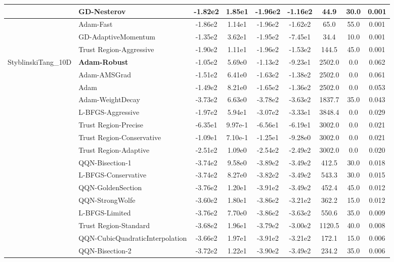 \documentclass{article}
\begin{document}
\begin{longtable}{|l|l|c|c|c|c|c|c|c|}
\hline
 & GD-Nesterov & -1.82e2 & 1.85e1 & -1.96e2 & -1.16e2 & 44.9 & 30.0 & 0.001 \\
\hline
 & Adam-Fast & -1.86e2 & 1.14e1 & -1.96e2 & -1.62e2 & 65.0 & 55.0 & 0.001 \\
\hline
 & GD-AdaptiveMomentum & -1.35e2 & 3.62e1 & -1.95e2 & -7.45e1 & 34.4 & 10.0 & 0.001 \\
\hline
 & Trust Region-Aggressive & -1.90e2 & 1.11e1 & -1.96e2 & -1.53e2 & 144.5 & 45.0 & 0.001 \\
StyblinskiTang\_10D & \textbf{Adam-Robust} & -1.05e2 & 5.69e0 & -1.13e2 & -9.23e1 & 2502.0 & 0.0 & 0.062 \\
\hline
 & Adam-AMSGrad & -1.51e2 & 6.41e0 & -1.63e2 & -1.38e2 & 2502.0 & 0.0 & 0.061 \\
\hline
 & Adam & -1.49e2 & 8.21e0 & -1.65e2 & -1.36e2 & 2502.0 & 0.0 & 0.053 \\
\hline
 & Adam-WeightDecay & -3.73e2 & 6.63e0 & -3.78e2 & -3.63e2 & 1837.7 & 35.0 & 0.043 \\
\hline
 & L-BFGS-Aggressive & -1.97e2 & 5.94e1 & -3.07e2 & -3.33e1 & 3848.4 & 0.0 & 0.029 \\
\hline
 & Trust Region-Precise & -6.35e1 & 9.97e-1 & -6.56e1 & -6.19e1 & 3002.0 & 0.0 & 0.021 \\
\hline
 & Trust Region-Conservative & -1.09e1 & 7.10e-1 & -1.25e1 & -9.28e0 & 3002.0 & 0.0 & 0.021 \\
\hline
 & Trust Region-Adaptive & -2.51e2 & 1.09e0 & -2.54e2 & -2.49e2 & 3002.0 & 0.0 & 0.020 \\
\hline
 & QQN-Bisection-1 & -3.74e2 & 9.58e0 & -3.89e2 & -3.49e2 & 412.5 & 30.0 & 0.018 \\
\hline
 & L-BFGS-Conservative & -3.74e2 & 8.27e0 & -3.82e2 & -3.49e2 & 543.3 & 30.0 & 0.015 \\
\hline
 & QQN-GoldenSection & -3.76e2 & 1.20e1 & -3.91e2 & -3.49e2 & 452.4 & 45.0 & 0.012 \\
\hline
 & QQN-StrongWolfe & -3.60e2 & 1.80e1 & -3.86e2 & -3.21e2 & 362.2 & 15.0 & 0.012 \\
\hline
 & L-BFGS-Limited & -3.76e2 & 7.70e0 & -3.86e2 & -3.63e2 & 550.6 & 35.0 & 0.009 \\
\hline
 & Trust Region-Standard & -3.68e2 & 1.96e1 & -3.79e2 & -3.00e2 & 1120.5 & 40.0 & 0.008 \\
\hline
 & QQN-CubicQuadraticInterpolation & -3.66e2 & 1.97e1 & -3.91e2 & -3.21e2 & 172.1 & 15.0 & 0.006 \\
\hline
 & QQN-Bisection-2 & -3.72e2 & 1.22e1 & -3.90e2 & -3.49e2 & 234.2 & 35.0 & 0.006 \\

\end{longtable}
\end{document}

